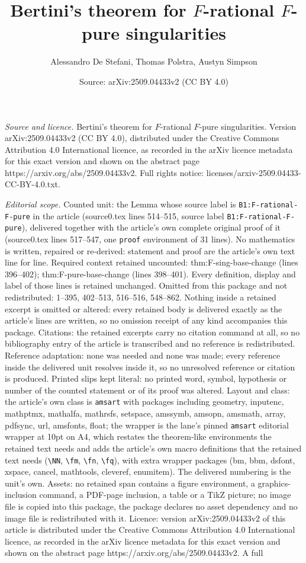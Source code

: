 \documentclass[10pt,a4paper]{amsart}
\title[Bertini's theorem for $F$-rational $F$-pure singularities]{Bertini's theorem for $F$-rational $F$-pure singularities}
\author{Alessandro De Stefani, Thomas Polstra, Austyn Simpson}
\date{Source: arXiv:2509.04433v2 (CC BY 4.0)}
\begin{document}
\maketitle

\noindent\emph{Source and licence.} Bertini's theorem for $F$-rational $F$-pure singularities. Version arXiv:2509.04433v2 (CC BY 4.0), distributed under the Creative Commons Attribution 4.0 International licence, as recorded in the arXiv licence metadata for this exact version and shown on the abstract page https://arxiv.org/abs/2509.04433v2. Full rights notice: licenses/arxiv-2509.04433-CC-BY-4.0.txt.\par\smallskip

\noindent\textit{Editorial scope.} Counted unit: the Lemma whose source label is \texttt{B1:F-rational-F-pure} in the article (source0.tex lines 514--515, source label \texttt{B1:F-rational-F-pure}), delivered together with the article's own complete original proof of it (source0.tex lines 517--547, one \texttt{proof} environment of 31 lines). No mathematics is written, repaired or re-derived: statement and proof are the article's own text line for line. Required context retained uncounted: thm:F-sing-base-change (lines 396--402); thm:F-pure-base-change (lines 398--401). Every definition, display and label of those lines is retained unchanged. Omitted from this package and not redistributed: 1--395, 402--513, 516--516, 548--862. Nothing inside a retained excerpt is omitted or altered: every retained body is delivered exactly as the article's lines are written, so no omission receipt of any kind accompanies this package. Citations: the retained excerpts carry no citation command at all, so no bibliography entry of the article is transcribed and no reference is redistributed. Reference adaptation: none was needed and none was made; every reference inside the delivered unit resolves inside it, so no unresolved reference or citation is produced. Printed slips kept literal: no printed word, symbol, hypothesis or number of the counted statement or of its proof was altered. Layout and class: the article's own class is \texttt{amsart} with packages including geometry, inputenc, mathptmx, mathalfa, mathrsfs, setspace, amssymb, amsopn, amsmath, array, pdfsync, url, amsfonts, float; the wrapper is the lane's pinned \texttt{amsart} editorial wrapper at 10pt on A4, which restates the theorem-like environments the retained text needs and adds the article's own macro definitions that the retained text needs (\texttt{\textbackslash NN}, \texttt{\textbackslash fm}, \texttt{\textbackslash fn}, \texttt{\textbackslash fq}), with extra wrapper packages (bm, bbm, dsfont, xspace, cancel, mathtools, cleveref, enumitem). The delivered numbering is the unit's own. Assets: no retained span contains a figure environment, a graphics-inclusion command, a PDF-page inclusion, a table or a TikZ picture; no image file is copied into this package, the package declares no asset dependency and no image file is redistributed with it. Licence: version arXiv:2509.04433v2 of this article is distributed under the Creative Commons Attribution 4.0 International licence, as recorded in the arXiv licence metadata for this exact version and shown on the abstract page https://arxiv.org/abs/2509.04433v2. A full 
\end{document}
